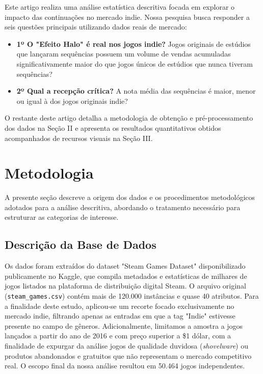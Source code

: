 \documentclass[conference]{IEEEtran}
\begin{document}
Este artigo realiza uma análise estatística descritiva focada em explorar o 
impacto das continuações no mercado indie. Nossa pesquisa busca responder a seis 
questões principais utilizando dados reais de mercado:

\begin{itemize}
    \item \textbf{1º O "Efeito Halo" é real nos jogos indie?} 
    Jogos originais de estúdios que lançaram sequências possuem um volume 
    de vendas acumuladas significativamente maior do que jogos únicos de 
    estúdios que nunca tiveram sequências?
    \item \textbf{2º Qual a recepção crítica?} 
    A nota média das sequências é maior, menor ou igual à dos jogos originais indie?
\end{itemize}   

O restante deste artigo detalha a metodologia de obtenção e pré-processamento 
dos dados na Seção II e apresenta os resultados quantitativos obtidos 
acompanhados de recursos visuais na Seção III.

\section{Metodologia}
A presente seção descreve a origem dos dados e os procedimentos metodológicos 
adotados para a análise descritiva, abordando o tratamento necessário para 
estruturar as categorias de interesse.

\subsection{Descrição da Base de Dados}
Os dados foram extraídos do dataset "Steam Games Dataset" disponibilizado 
publicamente no Kaggle, que compila metadados e estatísticas de milhares de 
jogos listados na plataforma de distribuição digital Steam. 
O arquivo original (\texttt{steam\_games.csv}) contém mais de 
120.000 instâncias e quase 40 atributos. Para a finalidade deste estudo, 
aplicou-se um recorte focado exclusivamente no mercado indie, 
filtrando apenas as entradas em que a tag "Indie" estivesse presente no 
campo de gêneros. Adicionalmente, limitamos a amostra a jogos lançados a 
partir do ano de 2016 e com preço superior a \$1 dólar, com a finalidade 
de expurgar da análise jogos de qualidade duvidosa (\textit{shovelware}) 
ou produtos abandonados e gratuitos que não representam o mercado 
competitivo real. O escopo final da nossa análise resultou em 
50.464 jogos independentes.
\end{document}
